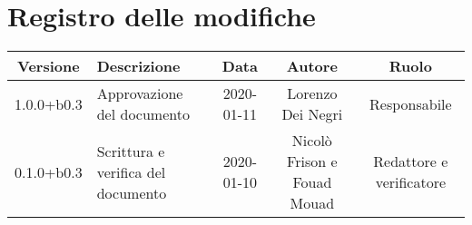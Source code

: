 \section*{Registro delle modifiche}

\begin{center}
	\begin{longtable}{|c|p{3cm}|c|c|c|}
	\hline
	\rowcolor{lighter-grayer}
	\textbf{Versione} & \textbf{Descrizione} & \textbf{Data} & \textbf{Autore} & \textbf{Ruolo} \\
	\hline
	\endfirsthead


	1.0.0+b0.3 & Approvazione del documento & 2020-01-11 & Lorenzo Dei Negri & Responsabile \\
	\hline
	0.1.0+b0.3 & Scrittura e verifica del documento & 2020-01-10 & Nicolò Frison e Fouad Mouad & Redattore e verificatore \\
	\hline

	\end{longtable}
\end{center}